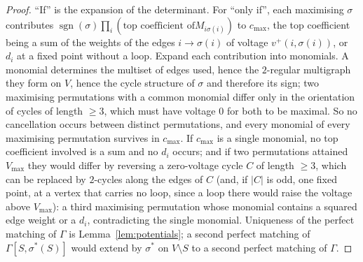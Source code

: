 \begin{proof}
``If'' is the expansion of the determinant. For ``only if'', each maximising
$\sigma$ contributes $\operatorname{sgn}(\sigma)\prod_i(\text{top coefficient of
}M_{i\sigma(i)})$ to $c_{\max}$, the top coefficient being a sum of the weights
of the edges $i\to\sigma(i)$ of voltage $v^+(i,\sigma(i))$, or $d_i$ at a fixed
point without a loop. Expand each contribution into monomials. A monomial
determines the multiset of edges used, hence the $2$-regular multigraph they
form on $V$, hence the cycle structure of $\sigma$ and therefore its sign;
two maximising permutations with a common monomial differ only in the
orientation of cycles of length $\ge3$, which must have voltage $0$ for both to
be maximal. So no cancellation occurs between distinct permutations, and every
monomial of every maximising permutation survives in $c_{\max}$. If
$c_{\max}$ is a single monomial, no top coefficient involved is a sum and no
$d_i$ occurs; and if two permutations attained $V_{\max}$ they would differ by
reversing a zero-voltage cycle $C$ of length $\ge3$, which can be replaced by
$2$-cycles along the edges of $C$ (and, if $|C|$ is odd, one fixed point, at a
vertex that carries no loop, since a loop there would raise the voltage above
$V_{\max}$): a third maximising permutation whose monomial contains a squared
edge weight or a $d_i$, contradicting the single monomial. Uniqueness of the
perfect matching of $\Gamma$ is Lemma~\ref{lem:potentials}; a second perfect
matching of $\Gamma[S,\sigma^*(S)]$ would extend by $\sigma^*$ on $V\setminus S$
to a second perfect matching of $\Gamma$.
\end{proof}

